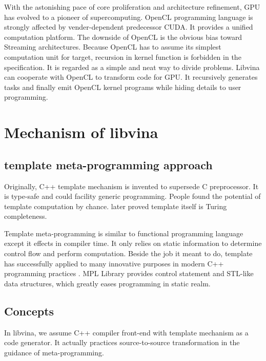 \documentclass[10pt, conference, compsocconf]{IEEEtran}
\begin{document}
With the astonishing pace of core proliferation and architecture refinement, GPU has evolved to a pioneer of supercomputing. OpenCL \cite{12} programming language is strongly affected by vender-dependent predecessor CUDA. It provides a unified computation platform. The downside of OpenCL is the obvious bias toward Streaming architectures. Because OpenCL has to assume its simplest computation unit for target, recursion in kernel function is forbidden in the specification. It is regarded as a simple and neat way to divide problems. Libvina can cooperate with OpenCL to transform code for GPU. It recursively generates tasks and finally emit OpenCL kernel programs while hiding details to user programming. 

\section{Mechanism of libvina}
\subsection{template meta-programming approach}
Originally, C++ template mechanism is invented to supersede C preprocessor. It is type-safe and could facility generic programming. People found the potential of template computation by chance. \cite{6} later proved template itself is Turing completeness. 

Template meta-programming is similar to functional programming language except it effects in compiler time. It only relies on static information to determine control flow and perform computation. Beside the job it meant to do, template has successfully applied to many innovative purposes in modern C++ programming practices \cite{9}. MPL Library \cite{16} provides control statement and STL-like data structures, which greatly eases programming in static realm.

\subsection{Concepts}
In libvina, we assume C++ compiler front-end with template mechanism as a code generator. It actually practices source-to-source transformation in the guidance of meta-programming. 
\end{document}
